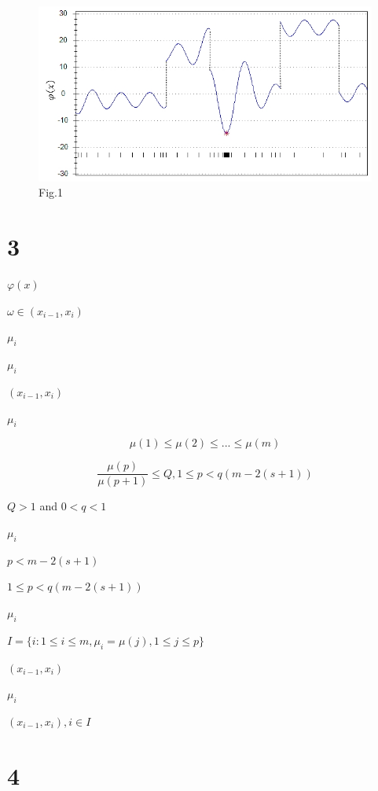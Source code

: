 \documentclass[runningheads]{llncs}
\begin{document}
\begin{figure}[!ht]
	\begin{center}
			\includegraphics[width=0.9\linewidth]{ris_1.jpg}
			\caption{Fig.1}
      \label{ris1}
	\end{center}
\end{figure}

\section{3}

$\varphi(x)$

$\omega \in(x_{i-1},x_i)$

$\mu_i$

$\mu_i$

$(x_{i-1},x_i)$

$\mu_i$

\begin{equation}\label{mu_cond}
\mu(1) \leq \mu(2) \leq ... \leq \mu(m)
\end{equation}

\begin{equation}\label{mu_main_cond}
 \frac{\mu(p)}{\mu(p+1)} \leq Q, 1 \leq p < q(m-2(s+1))
\end{equation}

$Q >1$ and $0<q<1$

$\mu_i$

$p<m-2(s+1)$

$1 \leq p<q(m-2(s+1))$

$\mu_i$

$I=\{i:1 \leq i \leq m,\mu_i=\mu(j),1 \leq j \leq p\}$

$(x_{i-1},x_i)$

$\mu_i$

$(x_{i-1},x_i), i \in I$

\section{4}
\end{document}
